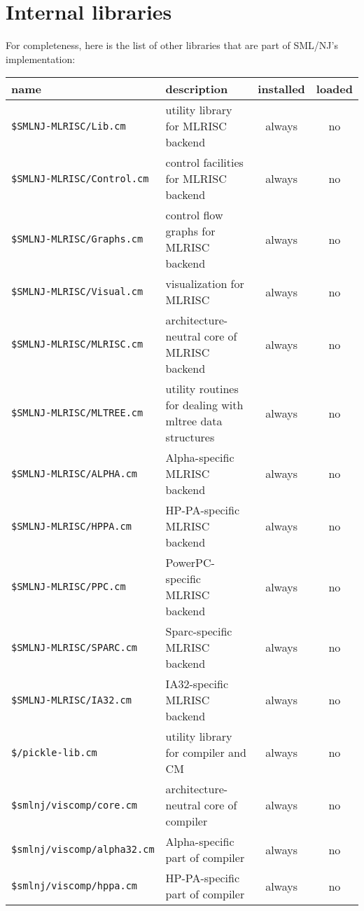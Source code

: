\section{Internal libraries}

For completeness, here is the list of other libraries that are part of
SML/NJ's implementation:

\begin{small}
\begin{center}
\begin{tabular}{p{2.5in}||p{2.6in}|c|c}
name & description & installed & loaded \\
\hline\hline
{\tt \$SMLNJ-MLRISC/Lib.cm} & utility library for MLRISC backend & always &
no \\
\hline
{\tt \$SMLNJ-MLRISC/Control.cm} & control facilities for MLRISC backend &
always & no \\
\hline
{\tt \$SMLNJ-MLRISC/Graphs.cm} & control flow graphs for MLRISC backend &
always & no \\
\hline
{\tt \$SMLNJ-MLRISC/Visual.cm} & visualization for MLRISC & always & no \\
\hline
{\tt \$SMLNJ-MLRISC/MLRISC.cm} & architecture-neutral core of MLRISC backend
& always & no \\
\hline
{\tt \$SMLNJ-MLRISC/MLTREE.cm} & utility routines for dealing with
mltree data structures & always & no \\
\hline
{\tt \$SMLNJ-MLRISC/ALPHA.cm} & Alpha-specific MLRISC backend & always & no \\
\hline
{\tt \$SMLNJ-MLRISC/HPPA.cm} & HP-PA-specific MLRISC backend & always & no \\
\hline
{\tt \$SMLNJ-MLRISC/PPC.cm} & PowerPC-specific MLRISC backend & always & no \\
\hline
{\tt \$SMLNJ-MLRISC/SPARC.cm} & Sparc-specific MLRISC backend & always & no \\
\hline
{\tt \$SMLNJ-MLRISC/IA32.cm} & IA32-specific MLRISC backend & always & no \\
\hline\hline
{\tt \$/pickle-lib.cm} & utility library for compiler and CM & always & no \\
\hline
{\tt \$smlnj/viscomp/core.cm} & architecture-neutral core of compiler
& always & no \\
\hline
{\tt \$smlnj/viscomp/alpha32.cm} & Alpha-specific part of compiler &
always & no \\
\hline
{\tt \$smlnj/viscomp/hppa.cm} & HP-PA-specific part of compiler &
always & no \\

\end{tabular}
\end{center}
\end{small}
